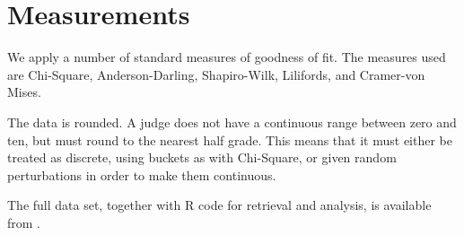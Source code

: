 \section{Measurements}
We apply a number of standard measures of goodness of fit. The measures used
are Chi-Square, Anderson-Darling, Shapiro-Wilk, Lilifords, and Cramer-von Mises.

The data is rounded. A judge does not have a continuous range between
zero and ten, but must round to the nearest half grade. This means that
it must either be treated as discrete, using buckets as with Chi-Square,
or given random perturbations in order to make them continuous.

The full data set, together with R code for retrieval and analysis, is
available from \cite{acdstats}.
